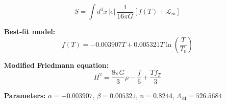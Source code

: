 
\begin{equation}
  S = \int d^4x \, |e| \, \frac{1}{16\pi G} \left[ f(T) + \mathcal{L}_m \right]
\end{equation}

\textbf{Best-fit model:}
\begin{equation}
  f(T) = -0.003907 T + 0.005321 T \ln\!\left(\frac{T}{T_0}\right)
\end{equation}

\textbf{Modified Friedmann equation:}
\begin{equation}
  H^2 = \frac{8\pi G}{3} \rho - \frac{f}{6} + \frac{T f_T}{3}
\end{equation}

\textbf{Parameters:}
$\alpha = -0.003907$, \quad
$\beta = 0.005321$, \quad
$n = 0.8244$, \quad
$\Lambda_{\text{BI}} = 526.5684$